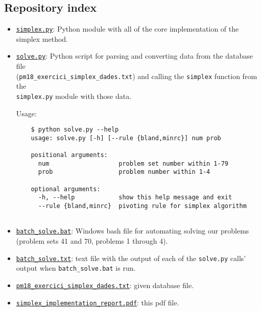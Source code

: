 \documentclass[a4paper]{article}
\begin{document}
\begin{appendices}

\section{Repository index}\label{apx:index}
\begin{itemize}
    \item\label{file:simplex.py} \href{run:./simplex.py}{\texttt{simplex.py}}: Python module with all of the core implementation of the simplex method.
    
    \item\label{file:solve.py} \href{run:./solve.py}{\texttt{solve.py}}: Python script for parsing and converting data from the database file \\ (\texttt{pm18_exercici_simplex_dades.txt}) and calling the \texttt{simplex} function from the \\ \texttt{simplex.py} module with those data.
    
    Usage:
    \begin{verbatim}
    $ python solve.py --help
    usage: solve.py [-h] [--rule {bland,minrc}] num prob
    
    positional arguments:
      num                   problem set number within 1-79
      prob                  problem number within 1-4
    
    optional arguments:
      -h, --help            show this help message and exit
      --rule {bland,minrc}  pivoting rule for simplex algorithm
      
    \end{verbatim}
    
    \item \href{run:./batch_solve.bat}{\texttt{batch_solve.bat}}: Windows bash file for automating solving our problems (problem sets 41 and 70, problems 1 through 4).
    
    \item\label{file:batch_solve.txt} \href{run:./batch_solve.txt}{\texttt{batch_solve.txt}}: text file with the output of each of the \texttt{solve.py} calls' output when \texttt{batch_solve.bat} is run.
    
    \item \href{run:./pm18_exercici_simplex_dades.txt}{\texttt{pm18_exercici_simplex_dades.txt}}: given database file.
    
    \item \href{run:./simplex_implementation_report.pdf}{\texttt{simplex_implementation_report.pdf}}: this pdf file.
\end{itemize}


\end{appendices}
\end{document}
